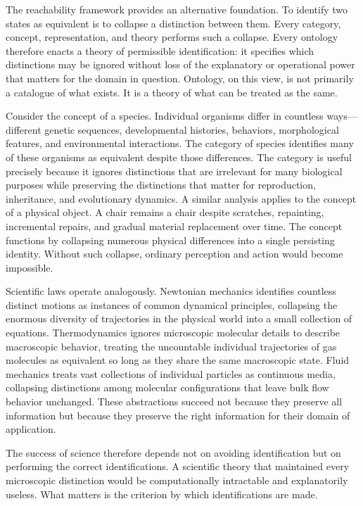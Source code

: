\documentclass[12pt,a4paper]{article}
\theoremstyle{plain}
\theoremstyle{definition}
\theoremstyle{remark}
\begin{document}
The reachability framework provides an alternative foundation. To identify
two states as equivalent is to collapse a distinction between them. Every
category, concept, representation, and theory performs such a collapse.
Every ontology therefore enacts a theory of permissible identification: it
specifies which distinctions may be ignored without loss of the explanatory
or operational power that matters for the domain in question. Ontology, on
this view, is not primarily a catalogue of what exists. It is a theory of
what can be treated as the same.

Consider the concept of a species. Individual organisms differ in countless
ways---different genetic sequences, developmental histories, behaviors,
morphological features, and environmental interactions. The category of
species identifies many of these organisms as equivalent despite those
differences. The category is useful precisely because it ignores distinctions
that are irrelevant for many biological purposes while preserving the
distinctions that matter for reproduction, inheritance, and evolutionary
dynamics. A similar analysis applies to the concept of a physical object.
A chair remains a chair despite scratches, repainting, incremental repairs,
and gradual material replacement over time. The concept functions by
collapsing numerous physical differences into a single persisting identity.
Without such collapse, ordinary perception and action would become impossible.

Scientific laws operate analogously. Newtonian mechanics identifies countless
distinct motions as instances of common dynamical principles, collapsing the
enormous diversity of trajectories in the physical world into a small
collection of equations. Thermodynamics ignores microscopic molecular details
to describe macroscopic behavior, treating the uncountable individual
trajectories of gas molecules as equivalent so long as they share the same
macroscopic state. Fluid mechanics treats vast collections of individual
particles as continuous media, collapsing distinctions among molecular
configurations that leave bulk flow behavior unchanged. These abstractions
succeed not because they preserve all information but because they preserve
the right information for their domain of application.

The success of science therefore depends not on avoiding identification but
on performing the correct identifications. A scientific theory that
maintained every microscopic distinction would be computationally intractable
and explanatorily useless. What matters is the criterion by which
identifications are made.
\end{document}
